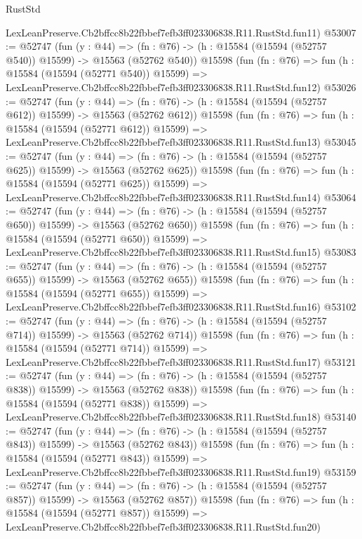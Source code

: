 \begin{lexlean}{RustStd}
\begin{coremodule}
    LexLeanPreserve.Cb2bffcc8b22fbbef7efb3ff023306838.R11.RustStd.fun11)
@53007 := @52747
    (fun (y : @44) =>
    (fn : @76) -> (h : @15584 (@15594 (@52757 @540)) @15599) -> @15563 (@52762 @540))
    @15598
    (fun (fn : @76) =>
    fun (h : @15584 (@15594 (@52771 @540)) @15599) =>
    LexLeanPreserve.Cb2bffcc8b22fbbef7efb3ff023306838.R11.RustStd.fun12)
@53026 := @52747
    (fun (y : @44) =>
    (fn : @76) -> (h : @15584 (@15594 (@52757 @612)) @15599) -> @15563 (@52762 @612))
    @15598
    (fun (fn : @76) =>
    fun (h : @15584 (@15594 (@52771 @612)) @15599) =>
    LexLeanPreserve.Cb2bffcc8b22fbbef7efb3ff023306838.R11.RustStd.fun13)
@53045 := @52747
    (fun (y : @44) =>
    (fn : @76) -> (h : @15584 (@15594 (@52757 @625)) @15599) -> @15563 (@52762 @625))
    @15598
    (fun (fn : @76) =>
    fun (h : @15584 (@15594 (@52771 @625)) @15599) =>
    LexLeanPreserve.Cb2bffcc8b22fbbef7efb3ff023306838.R11.RustStd.fun14)
@53064 := @52747
    (fun (y : @44) =>
    (fn : @76) -> (h : @15584 (@15594 (@52757 @650)) @15599) -> @15563 (@52762 @650))
    @15598
    (fun (fn : @76) =>
    fun (h : @15584 (@15594 (@52771 @650)) @15599) =>
    LexLeanPreserve.Cb2bffcc8b22fbbef7efb3ff023306838.R11.RustStd.fun15)
@53083 := @52747
    (fun (y : @44) =>
    (fn : @76) -> (h : @15584 (@15594 (@52757 @655)) @15599) -> @15563 (@52762 @655))
    @15598
    (fun (fn : @76) =>
    fun (h : @15584 (@15594 (@52771 @655)) @15599) =>
    LexLeanPreserve.Cb2bffcc8b22fbbef7efb3ff023306838.R11.RustStd.fun16)
@53102 := @52747
    (fun (y : @44) =>
    (fn : @76) -> (h : @15584 (@15594 (@52757 @714)) @15599) -> @15563 (@52762 @714))
    @15598
    (fun (fn : @76) =>
    fun (h : @15584 (@15594 (@52771 @714)) @15599) =>
    LexLeanPreserve.Cb2bffcc8b22fbbef7efb3ff023306838.R11.RustStd.fun17)
@53121 := @52747
    (fun (y : @44) =>
    (fn : @76) -> (h : @15584 (@15594 (@52757 @838)) @15599) -> @15563 (@52762 @838))
    @15598
    (fun (fn : @76) =>
    fun (h : @15584 (@15594 (@52771 @838)) @15599) =>
    LexLeanPreserve.Cb2bffcc8b22fbbef7efb3ff023306838.R11.RustStd.fun18)
@53140 := @52747
    (fun (y : @44) =>
    (fn : @76) -> (h : @15584 (@15594 (@52757 @843)) @15599) -> @15563 (@52762 @843))
    @15598
    (fun (fn : @76) =>
    fun (h : @15584 (@15594 (@52771 @843)) @15599) =>
    LexLeanPreserve.Cb2bffcc8b22fbbef7efb3ff023306838.R11.RustStd.fun19)
@53159 := @52747
    (fun (y : @44) =>
    (fn : @76) -> (h : @15584 (@15594 (@52757 @857)) @15599) -> @15563 (@52762 @857))
    @15598
    (fun (fn : @76) =>
    fun (h : @15584 (@15594 (@52771 @857)) @15599) =>
    LexLeanPreserve.Cb2bffcc8b22fbbef7efb3ff023306838.R11.RustStd.fun20)

\end{coremodule}
\end{lexlean}
